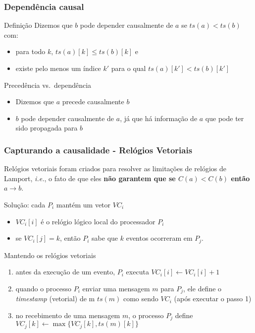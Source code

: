 \documentclass[Ligatures=TeX,table,brazil,svgnames,usetotalslideindicator,compress,10pt]{beamer}
\begin{document}
\begin{frame}
  \frametitle{Dependência causal}
  \begin{block}{Definição}
    Dizemos que $b$ pode depender causalmente de $a$ se $ts(a) < ts(b)$ com:
    \begin{itemize}
    \item para todo $k$, $ts(a)[k] \le ts(b)[k]$ e
    \item existe pelo menos um índice $k'$ para o qual $ts(a)[k'] < ts(b)[k']$
    \end{itemize}
  \end{block}

  \begin{block}{Precedência vs.\ dependência}
    \begin{itemize}
    \item Dizemos que $a$ precede causalmente $b$
    \item $b$ \alert{pode} depender causalmente de $a$, já que há informação de $a$ que pode ter sido propagada para $b$
    \end{itemize}
  \end{block}
\end{frame}

\begin{frame}
  \frametitle{Capturando a causalidade - Relógios Vetoriais}
  \alert{Relógios vetoriais foram criados para resolver as limitações
    de relógios de Lamport}, \emph{i.e.}, o fato de que eles
  \textbf{não garantem que se $C(a) < C(b)$ então $a \rightarrow b$}.

\mbox{}

    \begin{block}{Solução: cada $P_i$ mantém um vetor $VC_i$}
      \begin{itemize}
      \item $VC_i[i]$ é o relógio lógico local do processador $P_i$
      \item se $VC_i[j] = k$, então $P_i$ sabe que $k$ eventos ocorreram em $P_j$.
      \end{itemize}
    \end{block}

    \begin{block}{Mantendo os relógios vetoriais}
      \begin{enumerate}
      \item antes da execução de um evento, $P_i$ executa $VC_i[i] \leftarrow VC_i[i]+1$
      \item quando o processo $P_i$ enviar uma mensagem $m$ para $P_j$, ele define o \textit{timestamp} (vetorial) de m $ts(m)$ como sendo $VC_i$ (após executar o passo 1)
      \item no recebimento de uma mensagem $m$, o processo $P_j$ define $VC_j[k] \leftarrow \max\{VC_j[k], ts(m)[k]\}$
      \end{enumerate}
    \end{block}

\end{frame}
\end{document}
